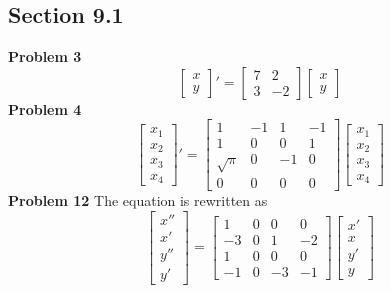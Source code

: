 \subsection*{Section 9.1}
\textbf{Problem 3}
\[
    \begin{bmatrix}
        x \\ y
    \end{bmatrix}'
    =
    \begin{bmatrix}
        7 & 2 \\
        3 & -2
    \end{bmatrix}
    \begin{bmatrix}
        x \\ y
    \end{bmatrix}
\]
\textbf{Problem 4}
\[
    \begin{bmatrix}
        x_1 \\ x_2 \\ x_3 \\ x_4
    \end{bmatrix}'
    =
    \begin{bmatrix}
        1 & -1 & 1 & -1 \\
        1 & 0 & 0 & 1 \\
        \sqrt{\pi} & 0 & -1 & 0 \\
        0 & 0 & 0 & 0
    \end{bmatrix}
    \begin{bmatrix}
        x_1 \\ x_2 \\ x_3 \\ x_4
    \end{bmatrix}
\]
\textbf{Problem 12}
The equation is rewritten as
\[
    \begin{bmatrix}
        x'' \\ x' \\ y'' \\ y'
    \end{bmatrix}
    =
    \begin{bmatrix}
        1 & 0 & 0 & 0 \\
        -3 & 0 & 1 & -2 \\
        1 & 0 & 0 & 0 \\
        -1 & 0 & -3 & -1 
    \end{bmatrix}
    \begin{bmatrix}
        x' \\ x \\ y' \\ y
    \end{bmatrix}
\]
